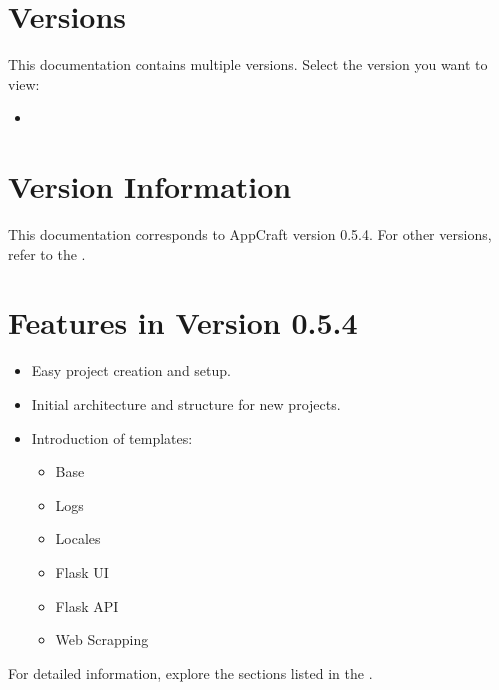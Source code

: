 \documentclass[letterpaper,10pt,english]{sphinxhowto}
\begin{document}
\section{Versions}
\label{\detokenize{versions/index:versions}}\label{\detokenize{versions/index::doc}}
\sphinxAtStartPar
This documentation contains multiple versions. Select the version you want to view:

\sphinxAtStartPar
{}
\begin{itemize}
\item {} 
\sphinxAtStartPar
{}

\end{itemize}


\section{Version Information}
\label{\detokenize{index:version-information}}
\sphinxAtStartPar
This documentation corresponds to AppCraft version 0.5.4. For other versions, refer to the .


\section{Features in Version 0.5.4}
\label{\detokenize{index:features-in-version-release}}\begin{itemize}
\item {} 
\sphinxAtStartPar
Easy project creation and setup.

\item {} 
\sphinxAtStartPar
Initial architecture and structure for new projects.

\item {} 
\sphinxAtStartPar
Introduction of templates:
\begin{itemize}
\item {} 
\sphinxAtStartPar
Base

\item {} 
\sphinxAtStartPar
Logs

\item {} 
\sphinxAtStartPar
Locales

\item {} 
\sphinxAtStartPar
Flask UI

\item {} 
\sphinxAtStartPar
Flask API

\item {} 
\sphinxAtStartPar
Web Scrapping

\end{itemize}

\end{itemize}

\sphinxAtStartPar
For detailed information, explore the sections listed in the {\hyperref[\detokenize{index:overview}]{}}.



\renewcommand{\indexname}{Index}
\printindex
\end{document}
